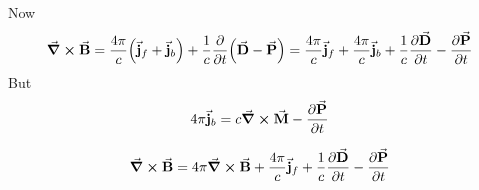 Now
\begin{align*}
\curl{\va{B}} = \frac{4\pi}{c} \qty(\va{j}_f+\va{j}_b) +\frac{1}{c} \pdv{t} \qty(\va{D}-\va{P}) =\frac{4\pi}{c} \va{j}_f+\frac{4\pi}{c} \va{j}_b +\frac{1}{c} \pdv{\va{D}}{t} -\pdv{\va{P}}{t} 
\end{align*}
But
$$4\pi\va{j}_b = c \curl{\va{M}} - \pdv{\va{P}}{t} $$

\begin{align*}
\curl{\va{B}} =4\pi \curl{\va{B}} +\frac{4\pi}{c} \va{j}_f +\frac{1}{c} \pdv{\va{D}}{t} -\pdv{\va{P}}{t} 
\end{align*}